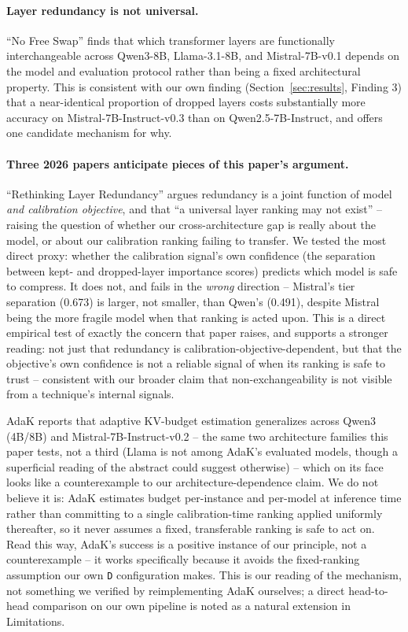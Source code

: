 \documentclass[11pt]{article}
\begin{document}
\paragraph{Layer redundancy is not universal.} ``No Free Swap''
\citep{nofreeswap2026} finds that which transformer layers are
functionally interchangeable across Qwen3-8B, Llama-3.1-8B, and
Mistral-7B-v0.1 depends on the model and evaluation protocol rather than
being a fixed architectural property. This is consistent with our own
finding (Section~\ref{sec:results}, Finding 3) that a near-identical
proportion of dropped layers costs substantially more accuracy on
Mistral-7B-Instruct-v0.3 than on Qwen2.5-7B-Instruct, and offers one
candidate mechanism for why.

\paragraph{Three 2026 papers anticipate pieces of this paper's argument.}
``Rethinking Layer Redundancy'' \citep{rethinkredundancy2026} argues
redundancy is a joint function of model \emph{and calibration objective},
and that ``a universal layer ranking may not exist'' -- raising the
question of whether our cross-architecture gap is really about the model,
or about our calibration ranking failing to transfer. We tested the most
direct proxy: whether the calibration signal's own confidence (the
separation between kept- and dropped-layer importance scores) predicts
which model is safe to compress. It does not, and fails in the
\emph{wrong} direction -- Mistral's tier separation (0.673) is larger, not
smaller, than Qwen's (0.491), despite Mistral being the more fragile model
when that ranking is acted upon. This is a direct empirical test of
exactly the concern that paper raises, and supports a stronger reading:
not just that redundancy is calibration-objective-dependent, but that the
objective's own confidence is not a reliable signal of when its ranking is
safe to trust -- consistent with our broader claim that non-exchangeability
is not visible from a technique's internal signals.

AdaK \citep{adak2026} reports that adaptive KV-budget estimation
generalizes across Qwen3 (4B/8B) and Mistral-7B-Instruct-v0.2 -- the same
two architecture families this paper tests, not a third (Llama is not
among AdaK's evaluated models, though a superficial reading of the
abstract could suggest otherwise) -- which on its face looks like a
counterexample to our architecture-dependence claim. We do not believe it
is: AdaK estimates budget per-instance and per-model at inference time
rather than committing to a single calibration-time ranking applied
uniformly thereafter, so it never assumes a fixed, transferable ranking is
safe to act on. Read this way, AdaK's success is a positive instance of
our principle, not a counterexample -- it works specifically because it
avoids the fixed-ranking assumption our own \texttt{D} configuration
makes. This is our reading of the mechanism, not something we verified by
reimplementing AdaK ourselves; a direct head-to-head comparison on our own
pipeline is noted as a natural extension in Limitations.
\end{document}
